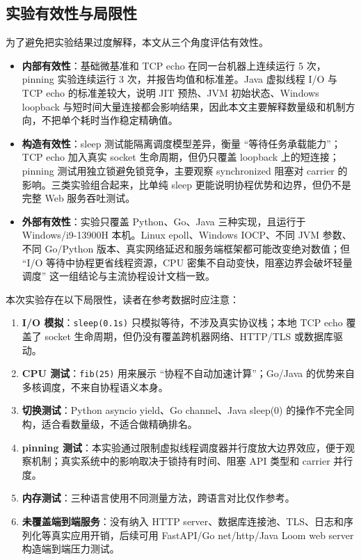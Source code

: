 \documentclass[UTF8,a4paper,12pt]{ctexart}
\begin{document}
\subsection{实验有效性与局限性}

为了避免把实验结果过度解释，本文从三个角度评估有效性。

\begin{itemize}
  \item \textbf{内部有效性}：基础微基准和 TCP echo 在同一台机器上连续运行 5 次，pinning 实验连续运行 3 次，并报告均值和标准差。Java 虚拟线程 I/O 与 TCP echo 的标准差较大，说明 JIT 预热、JVM 初始状态、Windows loopback 与短时间大量连接都会影响结果，因此本文主要解释数量级和机制方向，不把单个耗时当作稳定精确值。
  \item \textbf{构造有效性}：sleep 测试能隔离调度模型差异，衡量 ``等待任务承载能力''；TCP echo 加入真实 socket 生命周期，但仍只覆盖 loopback 上的短连接；pinning 测试用独立锁避免锁竞争，主要观察 synchronized 阻塞对 carrier 的影响。三类实验组合起来，比单纯 sleep 更能说明协程优势和边界，但仍不是完整 Web 服务吞吐测试。
  \item \textbf{外部有效性}：实验只覆盖 Python、Go、Java 三种实现，且运行于 Windows/i9-13900H 本机。Linux epoll、Windows IOCP、不同 JVM 参数、不同 Go/Python 版本、真实网络延迟和服务端框架都可能改变绝对数值；但 ``I/O 等待中协程更省线程资源，CPU 密集不自动变快，阻塞边界会破坏轻量调度'' 这一组结论与主流协程设计文档一致。
\end{itemize}

本次实验存在以下局限性，读者在参考数据时应注意：

\begin{enumerate}
  \item \textbf{I/O 模拟}：\verb|sleep(0.1s)| 只模拟等待，不涉及真实协议栈；本地 TCP echo 覆盖了 socket 生命周期，但仍没有覆盖跨机器网络、HTTP/TLS 或数据库驱动。
  \item \textbf{CPU 测试}：\verb|fib(25)| 用来展示 ``协程不自动加速计算''；Go/Java 的优势来自多核调度，不来自协程语义本身。
  \item \textbf{切换测试}：Python asyncio yield、Go channel、Java sleep(0) 的操作不完全同构，适合看数量级，不适合做精确排名。
  \item \textbf{pinning 测试}：本实验通过限制虚拟线程调度器并行度放大边界效应，便于观察机制；真实系统中的影响取决于锁持有时间、阻塞 API 类型和 carrier 并行度。
  \item \textbf{内存测试}：三种语言使用不同测量方法，跨语言对比仅作参考。
  \item \textbf{未覆盖端到端服务}：没有纳入 HTTP server、数据库连接池、TLS、日志和序列化等真实应用开销，后续可用 FastAPI/Go net/http/Java Loom web server 构造端到端压力测试。
\end{enumerate}
\end{document}
